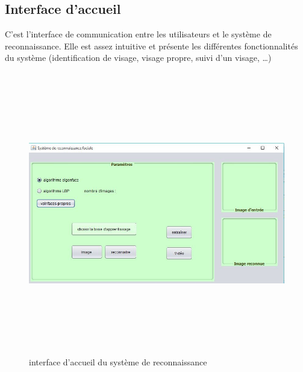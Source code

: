 \subsection{Interface d'accueil}
C'est l'interface de communication entre les utilisateurs et le système de reconnaissance. Elle est assez intuitive et présente les différentes fonctionnalités du système (identification de visage, visage propre, suivi d'un visage, \ldots)
\begin{figure}[htbp]
	\centering
		\includegraphics[width=450pt,height=350pt]{accueil.JPG}
	\caption{interface d'accueil du système de reconnaissance}
	\label{fig:accueil}
\end{figure}
